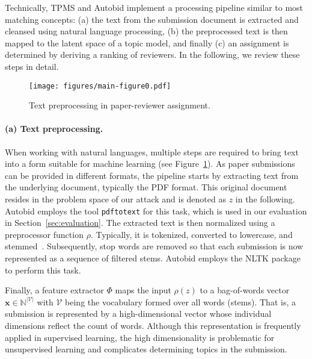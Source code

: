 \documentclass[letterpaper,twocolumn,10pt]{article}
\newcommand{\bow}{\textbf{x}}
\newcommand{\vocabulary}{\mathcal{V}}
\newcommand{\extractor}{\Phi}
\newcommand{\preprocessing}{\ensuremath{\rho}\xspace}
\newcommand{\inputpdf}{\ensuremath{z}\xspace}
\begin{document}
Technically, \ac{TPMS} and Autobid implement a processing pipeline similar to most matching concepts: (a) the text from the submission document is extracted and cleansed using natural language processing, (b) the preprocessed text is then mapped to the latent space of a topic model, and finally (c) an assignment is determined by deriving a ranking of reviewers. In the following, we review these steps in detail.

\begin{figure}[b]
    \centering
\texttt{[image: figures/main-figure0.pdf]}
    \caption{Text preprocessing in paper-reviewer assignment.}
    \label{fig:background_pipeline}
\end{figure}

\paragraph{(a) Text preprocessing.}
When working with natural languages, multiple steps are required to bring text into a form suitable for machine learning (see Figure~\ref{fig:background_pipeline}). 
As paper submissions can be provided in different formats, the pipeline starts by extracting text from the underlying document, typically the PDF format. This original document resides in the problem space of our attack and is denoted as \inputpdf in the following. Autobid employs the tool \texttt{pdftotext} for this task, which is used in our evaluation in Section~\ref{sec:evaluation}.
The extracted text is then normalized using a preprocessor function \preprocessing. Typically, it is tokenized, converted to lowercase, and stemmed~\cite{lovins-68-development}. Subsequently, stop words are removed so that each submission is now represented as a sequence of filtered stems. Autobid employs the NLTK package \citep{bird-09-natural} to perform this task. 

Finally, a feature extractor $\extractor$ maps the input $\preprocessing(\inputpdf)$ to a bag-of-words vector $\bow \in \mathbb{N}^{|\vocabulary|}$ with $\vocabulary$ being the vocabulary formed over all words (stems). That is, a submission is represented by a high-dimensional vector whose individual dimensions reflect the count of words.  Although this representation is frequently applied in supervised learning, the high dimensionality is problematic for unsupervised learning and complicates determining topics in the submission.
\end{document}

